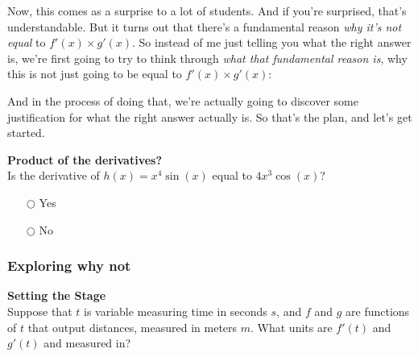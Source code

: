 \documentclass[pdftex, brazil, 12pt, twoside]{article}
\begin{document}
Now, this comes as a surprise to a lot of students.
And if you're surprised, that's understandable.
But it turns out that there's a fundamental reason \emph{why it's not
equal} to $f'(x) \times g'(x)$.
So instead of me just telling you what the right answer is,
we're first going to try to think through \emph{what
that fundamental reason is}, why this is not just going to be
equal to $f'(x) \times g'(x)$:

\begin{figure}[H]
  \begin{center}
  \end{center}
\end{figure}

And in the process of doing that,
we're actually going to discover some justification for what
the right answer actually is.
So that's the plan, and let's get started.

\begin{exercise}
  \textbf{Product of the derivatives?}\\%
  Is the derivative of $h(x) = x^4 \sin{(x)}$ equal to $4x^3 \cos{(x)}$?
  \begin{itemize}[noitemsep]
  \item[$\bigcirc$] Yes
  \item[$\bigcirc$] No
  \end{itemize}
\end{exercise}

\subsubsection{Exploring why not}
\label{u2-product-rule-why-not}

\begin{exercise}
  \textbf{Setting the Stage}\\%
  Suppose that $t$ is variable measuring time in seconds $s$, and $f$ and $g$ are
  functions of $t$ that output distances, measured in meters $m$. What units are
  $f'(t)$ and $g'(t)$ and measured in?
\end{exercise}
\end{document}
